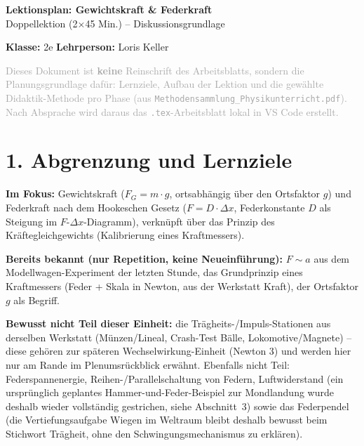 \documentclass[11pt,a4paper]{article}
\begin{document}
\sloppy

\begin{center}
{\Huge\bfseries\color{titleblue}Lektionsplan: Gewichtskraft \& Federkraft}\\[0.4em]
{\large Doppellektion (2$\times$45 Min.) -- Diskussionsgrundlage}
\end{center}
\vspace{0.5em}

\noindent\textbf{Klasse:} 2e \hfill \textbf{Lehrperson:} Loris Keller

\vspace{0.3em}
\noindent\textcolor{darkgray}{Dieses Dokument ist \textbf{keine} Reinschrift des Arbeitsblatts, sondern die
Planungsgrundlage dafür: Lernziele, Aufbau der Lektion und die gewählte
Didaktik-Methode pro Phase (aus \texttt{Methodensammlung\_Physikunterricht.pdf}).
Nach Absprache wird daraus das \texttt{.tex}-Arbeitsblatt lokal in VS Code
erstellt.}

\section*{1. Abgrenzung und Lernziele}

\textbf{Im Fokus:} Gewichtskraft ($F_G = m\cdot g$, ortsabhängig über den
Ortsfaktor $g$) und Federkraft nach dem Hookeschen Gesetz
($F = D\cdot\Delta x$, Federkonstante $D$ als Steigung im
$F$-$\Delta x$-Diagramm), verknüpft über das Prinzip des
Kräftegleichgewichts (Kalibrierung eines Kraftmessers).

\textbf{Bereits bekannt (nur Repetition, keine Neueinführung):} $F\sim a$ aus
dem Modellwagen-Experiment der letzten Stunde, das Grundprinzip eines
Kraftmessers (Feder + Skala in Newton, aus der Werkstatt Kraft), der
Ortsfaktor $g$ als Begriff.

\textbf{Bewusst nicht Teil dieser Einheit:} die Trägheits-/Impuls-Stationen
aus derselben Werkstatt (Münzen/Lineal, Crash-Test Bälle, Lokomotive/Magnete)
-- diese gehören zur späteren Wechselwirkung-Einheit (Newton 3) und werden
hier nur am Rande im Plenumsrückblick erwähnt. Ebenfalls nicht Teil:
Federspannenergie, Reihen-/Parallelschaltung von Federn, Luftwiderstand
(ein ursprünglich geplantes Hammer-und-Feder-Beispiel zur Mondlandung wurde
deshalb wieder vollständig gestrichen, siehe Abschnitt~3) sowie das
Federpendel (die Vertiefungsaufgabe \glqq Wiegen im Weltraum\grqq{} bleibt
deshalb bewusst beim Stichwort Trägheit, ohne den
Schwingungsmechanismus zu erklären).
\end{document}

